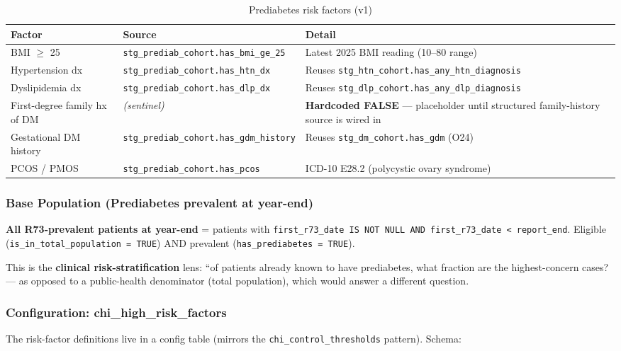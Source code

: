 \documentclass[11pt,a4paper]{article}
\begin{document}
\begin{table}[ht]
\centering\small
\caption{Prediabetes risk factors (v1)}
\begin{tabular}{@{}p{} p{} p{}@{}}
\toprule
\textbf{Factor} & \textbf{Source} & \textbf{Detail} \\
\midrule
BMI $\geq$ 25 & \texttt{stg\_prediab\_cohort.has\_bmi\_ge\_25} & Latest 2025 BMI reading (10--80 range) \\
Hypertension dx & \texttt{stg\_prediab\_cohort.has\_htn\_dx} & Reuses \texttt{stg\_htn\_cohort.has\_any\_htn\_diagnosis} \\
Dyslipidemia dx & \texttt{stg\_prediab\_cohort.has\_dlp\_dx} & Reuses \texttt{stg\_dlp\_cohort.has\_any\_dlp\_diagnosis} \\
First-degree family hx of DM & \emph{(sentinel)} & \textbf{Hardcoded FALSE} --- placeholder until structured family-history source is wired in \\
Gestational DM history & \texttt{stg\_prediab\_cohort.has\_gdm\_history} & Reuses \texttt{stg\_dm\_cohort.has\_gdm} (O24) \\
PCOS / PMOS & \texttt{stg\_prediab\_cohort.has\_pcos} & ICD-10 E28.2 (polycystic ovary syndrome) \\
\bottomrule
\end{tabular}
\end{table}

\subsubsection{Base Population (Prediabetes prevalent at year-end)}
\textbf{All R73-prevalent patients at year-end} = patients with \texttt{first\_r73\_date IS NOT NULL AND first\_r73\_date < report\_end}. Eligible (\texttt{is\_in\_total\_population = TRUE}) AND prevalent (\texttt{has\_prediabetes = TRUE}).

This is the \textbf{clinical risk-stratification} lens: ``of patients already known to have prediabetes, what fraction are the highest-concern cases? --- as opposed to a public-health denominator (total population), which would answer a different question.

\subsubsection{Configuration: chi\_high\_risk\_factors}
The risk-factor definitions live in a config table (mirrors the \texttt{chi\_control\_thresholds} pattern). Schema:
\end{document}
